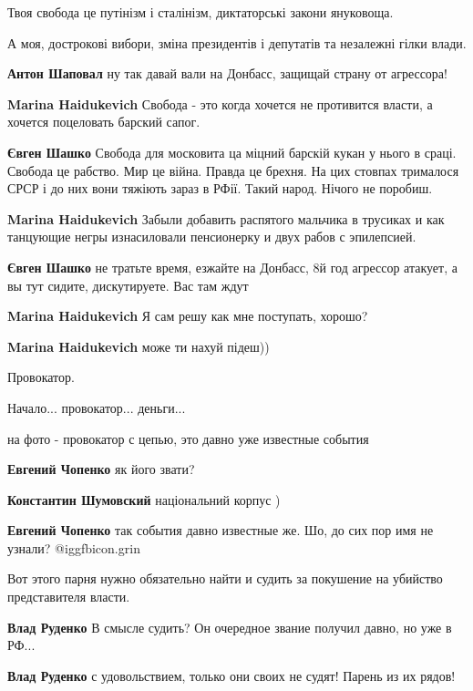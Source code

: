 \begin{multicols}{2}
Твоя свобода це путінізм і сталінізм, диктаторські закони януковоща.

А моя, дострокові вибори, зміна президентів і депутатів та незалежні гілки
влади.

\textbf{Антон Шаповал} ну так давай вали на Донбасс, защищай страну от агрессора!

\textbf{Marina Haidukevich} Свобода - это когда хочется не противится власти, а хочется поцеловать барский сапог.

\textbf{Євген Шашко} Свобода для московита ца міцний барскій кукан у нього в сраці.
Свобода це рабство. Мир це війна. Правда це брехня. На цих стовпах трималося СРСР і до них вони тяжіють зараз в РФії.
Такий народ. Нічого не поробиш.

\textbf{Marina Haidukevich} Забыли добавить распятого мальчика в трусиках и как танцующие негры изнасиловали пенсионерку и двух рабов с эпилепсией.

\textbf{Євген Шашко} не тратьте время, езжайте на Донбасс, 8й год агрессор атакует, а вы тут сидите, дискутируете. Вас там ждут

\textbf{Marina Haidukevich} Я сам решу как мне поступать, хорошо?

\textbf{Marina Haidukevich} може ти нахуй підеш))

Провокатор.

Начало... провокатор... деньги...

на фото - провокатор с цепью, это давно уже известные события

\textbf{Евгений Чопенко} як його звати?

\textbf{Константин Шумовский} національний корпус )

\textbf{Евгений Чопенко} так события давно известные же. Шо, до сих пор имя не узнали? @igg{fbicon.grin} 

Вот этого парня нужно обязательно найти и судить за покушение на убийство представителя власти.

\textbf{Влад Руденко} В смысле судить? Он очередное звание получил давно, но уже в РФ...

\textbf{Влад Руденко} с удовольствием, только они своих не судят! Парень из их рядов!


\end{multicols}
